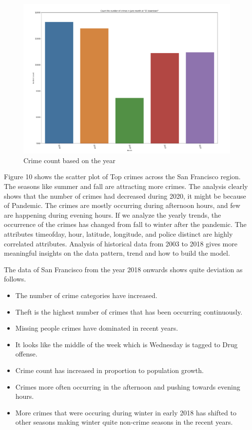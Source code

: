 \documentclass[conference,final,]{IEEEtran}
\providecommand{\tightlist}{%
  \setlength{\itemsep}{0pt}\setlength{\parskip}{0pt}}
\begin{document}
\begin{figure}

{\centering \includegraphics[width=0.5\linewidth]{img/fig11} 

}

\caption{Crime count based on the year}\label{fig:unnamed-chunk-11}
\end{figure}

Figure 10 shows the scatter plot of Top crimes across the San Francisco
region. The seasons like summer and fall are attracting more crimes. The
analysis clearly shows that the number of crimes had decreased during
2020, it might be because of Pandemic. The crimes are mostly occurring
during afternoon hours, and few are happening during evening hours. If
we analyze the yearly trends, the occurrence of the crimes has changed
from fall to winter after the pandemic. The attributes timeofday, hour,
latitude, longitude, and police distinct are highly correlated
attributes. Analysis of historical data from 2003 to 2018 gives more
meaningful insights on the data pattern, trend and how to build the
model.

The data of San Francisco from the year 2018 onwards shows quite
deviation as follows.

\begin{itemize}
\tightlist
\item
  The number of crime categories have increased.
\item
  Theft is the highest number of crimes that has been occurring
  continuously.
\item
  Missing people crimes have dominated in recent years.
\item
  It looks like the middle of the week which is Wednesday is tagged to
  Drug offense.
\item
  Crime count has increased in proportion to population growth.
\item
  Crimes more often occurring in the afternoon and pushing towards
  evening hours.
\item
  More crimes that were occuring during winter in early 2018 has shifted
  to other seasons making winter quite non-crime seasons in the recent
  years.
\end{itemize}
\end{document}
